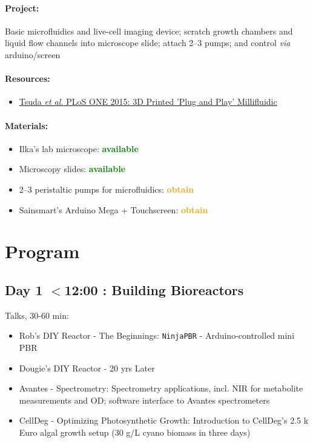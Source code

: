 \documentclass[12pt,a4paper]{scrartcl}
\newcommand{\obtain}[0]{\textcolor{orange}{\textbf{obtain}}}
\newcommand{\avail}[0]{\textcolor{green}{\textbf{available}}}
\begin{document}
\paragraph{Project:} Basic microfluidics and live-cell imaging device;
scratch growth chambers and liquid flow channels into microscope slide;
attach 2--3 pumps; and control \textit{via} arduino/screen

\paragraph{Resources:}
\begin{itemize}
\item \href{http://www.ncbi.nlm.nih.gov/pmc/articles/PMC4641590/}{Tsuda \textit{et al.} PLoS ONE 2015: 3D Printed 'Plug and Play' Millifluidic}
\end{itemize}

\paragraph{Materials:}
\begin{itemize}
\item Ilka's lab microscope: \avail{}
\item Microscopy slides: \avail{}
\item 2--3 peristaltic pumps for microfluidics: \obtain{}
\item Sainsmart's Arduino Mega + Touchscreen: \obtain{}
\end{itemize}


\newpage

\section{Program}

\subsection{Day 1 $<$12:00 : Building Bioreactors}

Talks, 30-60 min:
\begin{itemize}
\item Rob's DIY Reactor - The Beginnings: \texttt{NinjaPBR} -
  Arduino-controlled mini PBR
\item Dougie's DIY Reactor - 20 yrs Later
\item Avantes - Spectrometry: Spectrometry applications, incl. NIR for
  metabolite measurements and OD; software interface to Avantes
  spectrometers
\item CellDeg - Optimizing Photosynthetic Growth: Introduction to
  CellDeg's 2.5 k Euro algal growth setup (30 g/L cyano
  biomass in three days)
\end{itemize}
\end{document}
